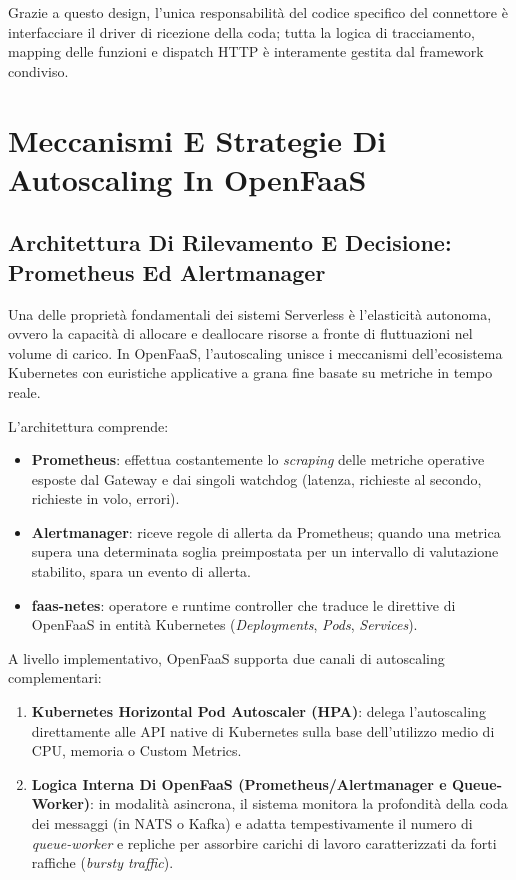 \documentclass[11pt, a4paper]{article}
\begin{document}
Grazie a questo design, l'unica responsabilità del codice specifico del connettore è interfacciare il driver di ricezione della coda; tutta la logica di tracciamento, mapping delle funzioni e dispatch HTTP è interamente gestita dal framework condiviso.

\newpage

\section{Meccanismi E Strategie Di Autoscaling In OpenFaaS}

\subsection{Architettura Di Rilevamento E Decisione: Prometheus Ed Alertmanager}
Una delle proprietà fondamentali dei sistemi Serverless è l'elasticità autonoma, ovvero la capacità di allocare e deallocare risorse a fronte di fluttuazioni nel volume di carico. In OpenFaaS, l'autoscaling unisce i meccanismi dell'ecosistema Kubernetes con euristiche applicative a grana fine basate su metriche in tempo reale.

L'architettura comprende:
\begin{itemize}[noitemsep]
    \item \textbf{Prometheus}: effettua costantemente lo \emph{scraping} delle metriche operative esposte dal Gateway e dai singoli watchdog (latenza, richieste al secondo, richieste in volo, errori).
    \item \textbf{Alertmanager}: riceve regole di allerta da Prometheus; quando una metrica supera una determinata soglia preimpostata per un intervallo di valutazione stabilito, spara un evento di allerta.
    \item \textbf{faas-netes}: operatore e runtime controller che traduce le direttive di OpenFaaS in entità Kubernetes (\emph{Deployments}, \emph{Pods}, \emph{Services}).
\end{itemize}

A livello implementativo, OpenFaaS supporta due canali di autoscaling complementari:
\begin{enumerate}
    \item \textbf{Kubernetes Horizontal Pod Autoscaler (HPA)}: delega l'autoscaling direttamente alle API native di Kubernetes sulla base dell'utilizzo medio di CPU, memoria o Custom Metrics.
    \item \textbf{Logica Interna Di OpenFaaS (Prometheus/Alertmanager e Queue-Worker)}: in modalità asincrona, il sistema monitora la profondità della coda dei messaggi (in NATS o Kafka) e adatta tempestivamente il numero di \emph{queue-worker} e repliche per assorbire carichi di lavoro caratterizzati da forti raffiche (\emph{bursty traffic}).
\end{enumerate}
\end{document}
